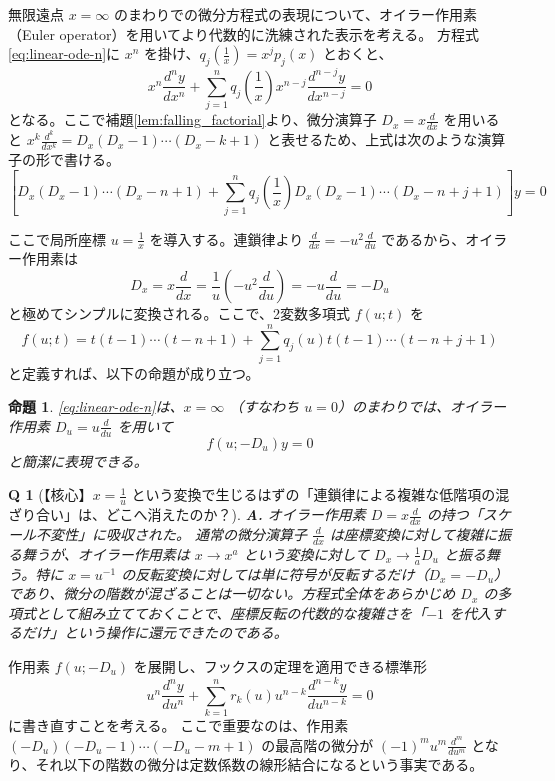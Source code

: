 \documentclass[paper=a4, fontsize=11pt]{jlreq} %
\theoremstyle{break}
\newtheorem{proposition}[theorem]{命題}
\theoremstyle{qa}
\newtheorem*{Q}{Q}
\theoremstyle{remark} %
\begin{document}
無限遠点 $x=\infty$ のまわりでの微分方程式の表現について、オイラー作用素（Euler operator）を用いてより代数的に洗練された表示を考える。
方程式\eqref{eq:linear-ode-n}に $x^{n}$ を掛け、$q_{j}\left(\frac{1}{x}\right) = x^{j}p_{j}(x)$ とおくと、
\begin{equation}\label{eq:ode-euler-x}
x^{n}\frac{d^{n}y}{dx^{n}} + \sum_{j=1}^{n} q_{j}\left(\frac{1}{x}\right) x^{n-j}\frac{d^{n-j}y}{dx^{n-j}} = 0
\end{equation}
となる。ここで補題\ref{lem:falling_factorial}より、微分演算子 $D_{x} = x\frac{d}{dx}$ を用いると $x^{k}\frac{d^{k}}{dx^{k}} = D_{x}(D_{x}-1)\cdots(D_{x}-k+1)$ と表せるため、上式は次のような演算子の形で書ける。
\[
\left[ D_{x}(D_{x}-1)\cdots(D_{x}-n+1) + \sum_{j=1}^{n}q_{j}\left(\frac{1}{x}\right) D_{x}(D_{x}-1)\cdots(D_{x}-n+j+1) \right] y = 0
\]

ここで局所座標 $u = \frac{1}{x}$ を導入する。連鎖律より $\frac{d}{dx} = -u^{2}\frac{d}{du}$ であるから、オイラー作用素は
\[
D_{x} = x\frac{d}{dx} = \frac{1}{u}\left(-u^{2}\frac{d}{du}\right) = -u\frac{d}{du} = -D_{u}
\]
と極めてシンプルに変換される。ここで、2変数多項式 $f(u; t)$ を
\[
f(u; t) = t(t-1)\cdots(t-n+1) + \sum_{j=1}^{n} q_{j}(u) t(t-1)\cdots(t-n+j+1)
\]
と定義すれば、以下の命題が成り立つ。

\begin{proposition}
\eqref{eq:linear-ode-n}は、$x=\infty$ （すなわち $u=0$）のまわりでは、オイラー作用素 $D_{u} = u\frac{d}{du}$ を用いて
\[
f(u; -D_{u})y = 0
\]
と簡潔に表現できる。
\end{proposition}

\begin{Q}[【核心】$x=\frac{1}{u}$ という変換で生じるはずの「連鎖律による複雑な低階項の混ざり合い」は、どこへ消えたのか？]
\textbf{A.} オイラー作用素 $D = x\frac{d}{dx}$ の持つ「スケール不変性」に吸収された。
通常の微分演算子 $\frac{d}{dx}$ は座標変換に対して複雑に振る舞うが、オイラー作用素は $x \to x^{a}$ という変換に対して $D_{x} \to \frac{1}{a} D_{u}$ と振る舞う。特に $x = u^{-1}$ の反転変換に対しては単に符号が反転するだけ（$D_{x} = -D_{u}$）であり、微分の階数が混ざることは一切ない。方程式全体をあらかじめ $D_{x}$ の多項式として組み立てておくことで、座標反転の代数的な複雑さを「$-1$ を代入するだけ」という操作に還元できたのである。
\end{Q}

作用素 $f(u; -D_{u})$ を展開し、フックスの定理を適用できる標準形
\[
u^{n}\frac{d^{n}y}{du^{n}} + \sum_{k=1}^{n} r_{k}(u) u^{n-k}\frac{d^{n-k}y}{du^{n-k}} = 0
\]
に書き直すことを考える。
ここで重要なのは、作用素 $(-D_{u})(-D_{u}-1)\cdots(-D_{u}-m+1)$ の最高階の微分が $(-1)^{m} u^{m} \frac{d^{m}}{du^{m}}$ となり、それ以下の階数の微分は定数係数の線形結合になるという事実である。
\end{document}
